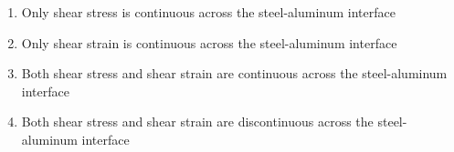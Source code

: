 \begin{enumerate}
    \item Only shear stress is continuous across the steel-aluminum interface
    \item Only shear strain is continuous across the steel-aluminum interface
    \item Both shear stress and shear strain are continuous across the steel-aluminum interface
    \item Both shear stress and shear strain are discontinuous across the steel-aluminum interface
\end{enumerate}

